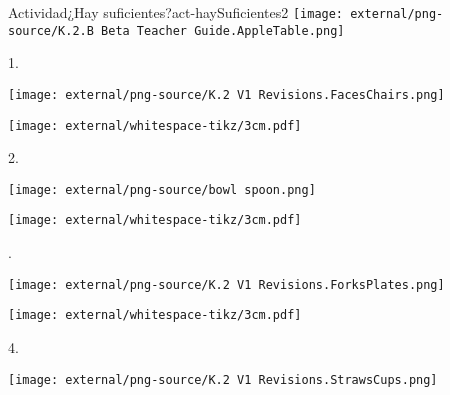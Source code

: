 \documentclass[20pt]{extarticle}
\begin{document}
\begin{activity}{Actividad}{¿Hay suficientes?}{act-haySuficientes2}%
\hfill\texttt{[image: external/png-source/K.2.B Beta Teacher Guide.AppleTable.png]}
\par
1.%
\begin{image}{0}{0.5}{0.5}{}%
\texttt{[image: external/png-source/K.2 V1 Revisions.FacesChairs.png]}
\end{image}%
\begin{image}{0}{1}{0}{}%
\texttt{[image: external/whitespace-tikz/3cm.pdf]}
\end{image}%
2.%
\begin{image}{0}{1}{0}{}%
\texttt{[image: external/png-source/bowl spoon.png]}
\end{image}%
\begin{image}{0}{1}{0}{}%
\texttt{[image: external/whitespace-tikz/3cm.pdf]}
\end{image}%
.%
\begin{image}{0}{1}{0}{}%
\texttt{[image: external/png-source/K.2 V1 Revisions.ForksPlates.png]}
\end{image}%
\begin{image}{0}{1}{0}{}%
\texttt{[image: external/whitespace-tikz/3cm.pdf]}
\end{image}%
4.%
\begin{image}{0}{1}{0}{}%
\texttt{[image: external/png-source/K.2 V1 Revisions.StrawsCups.png]}
\end{image}%
\end{activity}
\end{document}
